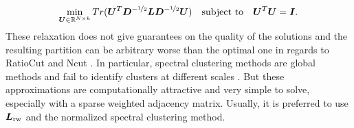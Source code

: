 \begin{equation}
  \min_{\boldsymbol U\in{\mathbb R}^{N\times k}} Tr(\boldsymbol U^T\boldsymbol D^{-\nicefrac{1}{2}}\boldsymbol L\boldsymbol D^{-\nicefrac{1}{2}}\boldsymbol U)\quad \textnormal{subject to}\quad \boldsymbol U^T\boldsymbol U = \boldsymbol I.
\end{equation}
These relaxation does not give guarantees on the quality of the solutions and the resulting partition can be arbitrary worse than the optimal one in regards to RatioCut and Ncut \citep{Guattery98,Nadler07fundamentallimitations}. In particular, spectral clustering methods are global methods and fail to identify clusters at different scales \citep{Nadler07fundamentallimitations}. But these approximations are computationally attractive and very simple to solve, especially with a sparse weighted adjacency matrix. Usually, it is preferred to use $\boldsymbol L_{\textnormal{rw}}$ and the normalized spectral clustering method.

